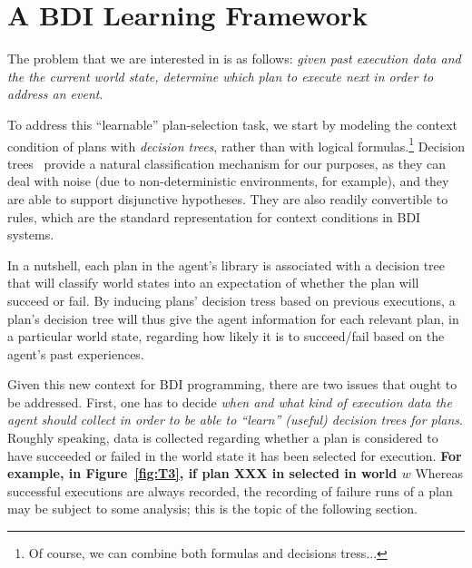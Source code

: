 \section{A BDI Learning Framework}\label{sec:framework}


The problem that we are interested in is as follows: \emph{given past execution
data and the the current world state, determine which plan to execute next 
in order to address an event}.


To address this ``learnable'' plan-selection task, we start by modeling the
context condition of plans with \emph{decision trees}, rather than with logical
formulas.\footnote{Of course, we can combine both formulas and decisions
tress...}
Decision trees~\cite{Mitchell97:ML}  provide a natural classification mechanism
for our purposes, as they can deal with noise (due to non-deterministic
environments, for example), and they are able to support disjunctive hypotheses.
They are also readily convertible to rules, which are the standard representation
for context conditions in BDI systems.




In a nutshell, each plan in the agent's library is associated with a decision
tree that will classify world states into an expectation of whether the plan will
succeed or fail. By inducing plans' decision tress based on previous executions,
a plan's decision tree will thus give the agent information for each relevant
plan, in a particular world state, regarding how likely it is to succeed/fail
based on the agent's past experiences.



Given this new context for BDI programming, there are two issues that ought to be
addressed.
First, one has to decide \emph{when and what kind of execution data the agent should
collect in order to be able to ``learn'' (useful) decision trees for plans}.
Roughly speaking, data is collected regarding whether a plan is considered to
have succeeded or failed in the world state it has been selected for execution.
\textbf{For example, in Figure~\ref{fig:T3}, if plan XXX in selected in world
$w$} %
Whereas successful executions are always recorded, the recording of failure runs
of a plan may be subject to some analysis; this is the topic of the following section.



